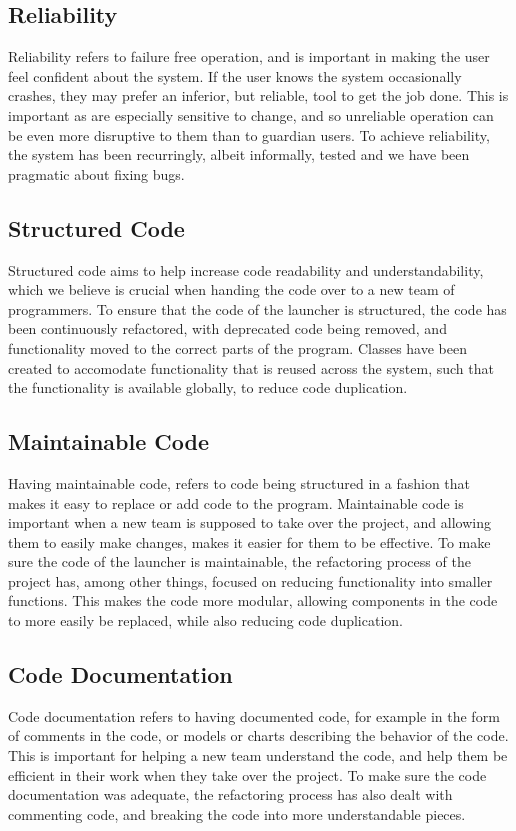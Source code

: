 \subsection*{Reliability}
Reliability refers to failure free operation, and is important in making the user feel confident about the system. 
If the user knows the system occasionally crashes, they may prefer an inferior, but reliable, tool to get the job done. 
This is important as \autists[] are especially sensitive to change, and so unreliable operation can be even more disruptive to them than to guardian users. 
To achieve reliability, the system has been recurringly, albeit informally, tested and we have been pragmatic about fixing bugs.

\subsection*{Structured Code}
Structured code aims to help increase code readability and understandability, which we believe is crucial when handing the code over to a new team of programmers. 
To ensure that the code of the launcher is structured, the code has been continuously refactored, with deprecated code being removed, and functionality moved to the correct parts of the program. 
Classes have been created to accomodate functionality that is reused across the system, such that the functionality is available globally, to reduce code duplication. 

\subsection*{Maintainable Code}
Having maintainable code, refers to code being structured in a fashion that makes it easy to replace or add code to the program. 
Maintainable code is important when a new team is supposed to take over the project, and allowing them to easily make changes, makes it easier for them to be effective. 
To make sure the code of the launcher is maintainable, the refactoring process of the project has, among other things, focused on reducing functionality into smaller functions. 
This makes the code more modular, allowing components in the code to more easily be replaced, while also reducing code duplication. 

\subsection*{Code Documentation}
Code documentation refers to having documented code, for example in the form of comments in the code, or models or charts describing the behavior of the code. 
This is important for helping a new team understand the code, and help them be efficient in their work when they take over the project. 
To make sure the code documentation was adequate, the refactoring process has also dealt with commenting code, and breaking the code into more understandable pieces. 


